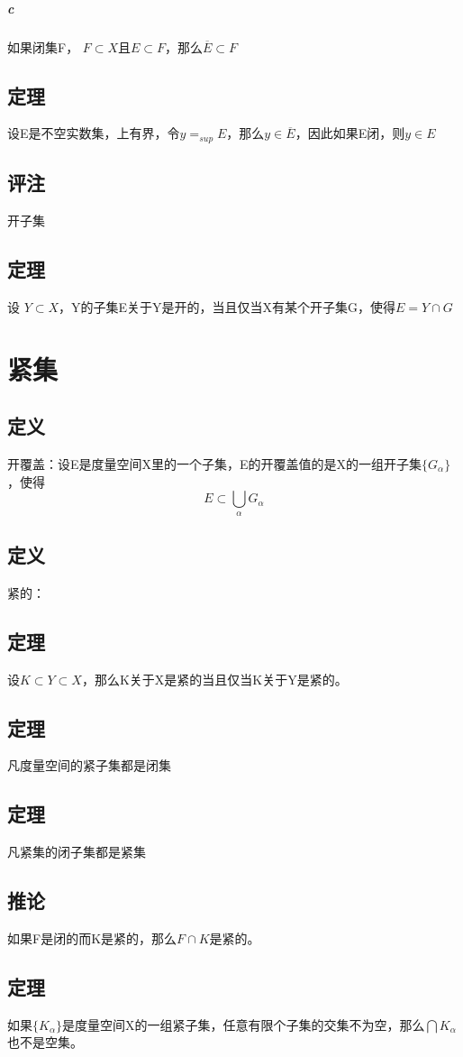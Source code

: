 \paragraph{c} 如果闭集F， $ F \subset X $且$E \subset F $，那么$\overline{E} \subset F$
\section{定理} 设E是不空实数集，上有界，令$ y = _{sup}E $，那么$ y \in \overline{E} $，因此如果E闭，则$y \in E $
\section{评注} 开子集
\section{定理} 设 $ Y \subset X $，Y的子集E关于Y是开的，当且仅当X有某个开子集G，使得$ E = Y \cap G $
\subparagraph*{}
\chapter*{紧集}
\section{定义} 开覆盖：设E是度量空间X里的一个子集，E的开覆盖值的是X的一组开子集$\{ G_{\alpha} \}$，使得$$ E \subset \bigcup_{\alpha}G_{\alpha} $$
\section{定义} 紧的：
\section{定理} 设$ K \subset Y \subset X $，那么K关于X是紧的当且仅当K关于Y是紧的。
\section{定理} 凡度量空间的紧子集都是闭集
\section{定理} 凡紧集的闭子集都是紧集
\section*{推论} 如果F是闭的而K是紧的，那么$ F\cap K $是紧的。
\section{定理} 如果$\{ K_{\alpha} \}$是度量空间X的一组紧子集，任意有限个子集的交集不为空，那么$\bigcap K_{\alpha} $也不是空集。
